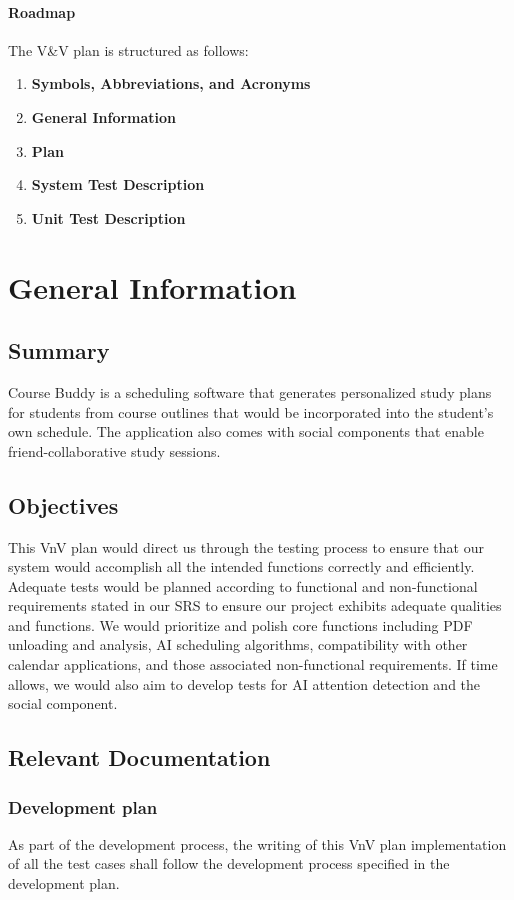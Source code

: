 \documentclass[12pt, titlepage]{article}
\begin{document}
\paragraph{Roadmap}
The V\&V plan is structured as follows:
\begin{enumerate}
    \item \textbf{Symbols, Abbreviations, and Acronyms}
    \item \textbf{General Information}
    \item \textbf{Plan} 
    \item \textbf{System Test Description} 
    \item \textbf{Unit Test Description}
\end{enumerate}
\section{General Information}

\subsection{Summary}
Course Buddy is a scheduling software that generates personalized study plans for students from course outlines that would be incorporated into the student's own schedule.  The application also comes with social components that enable friend-collaborative study sessions.

\subsection{Objectives}
This VnV plan would direct us through the testing process to ensure that our system would accomplish all the intended functions correctly and efficiently.  
Adequate tests would be planned according to functional and non-functional requirements stated in our SRS to ensure our project exhibits adequate qualities and functions.
We would prioritize and polish core functions including PDF unloading and analysis, AI scheduling algorithms, compatibility with other calendar applications, and those associated non-functional requirements. If time allows, we would also aim to develop tests for AI attention detection and the social component.


\subsection{Relevant Documentation}
\subsubsection{Development plan}
As part of the development process, the writing of this VnV plan implementation of all the test cases shall follow the development process specified in the development plan.
\end{document}
